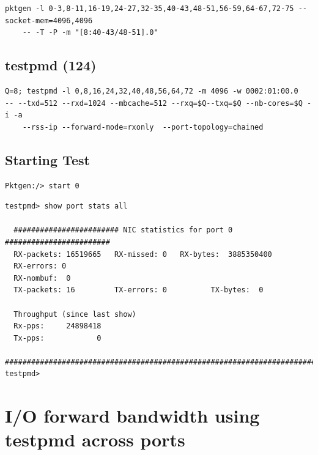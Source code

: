 \documentclass[letter]{article}
\begin{document}
{%
\begin{lstlisting}
pktgen -l 0-3,8-11,16-19,24-27,32-35,40-43,48-51,56-59,64-67,72-75 --socket-mem=4096,4096 
	-- -T -P -m "[8:40-43/48-51].0"
\end{lstlisting}

\subsection{testpmd (124)}

\begin{lstlisting}[escapechar=!]
Q=8; testpmd -l 0,8,16,24,32,40,48,56,64,72 -m 4096 -w 0002:01:00.0 
-- --txd=512 --rxd=1024 --mbcache=512 --rxq=$Q--txq=$Q --nb-cores=$Q -i -a 
	--rss-ip --forward-mode=rxonly  --port-topology=chained
\end{lstlisting}

\subsection{Starting Test}

\begin{lstlisting}[escapechar=!]
Pktgen:/> start 0
\end{lstlisting}

\begin{lstlisting}
testpmd> show port stats all

  ######################## NIC statistics for port 0  ########################
  RX-packets: 16519665   RX-missed: 0   RX-bytes:  3885350400
  RX-errors: 0
  RX-nombuf:  0         
  TX-packets: 16         TX-errors: 0          TX-bytes:  0

  Throughput (since last show)
  Rx-pps:     24898418
  Tx-pps:            0
  ############################################################################
testpmd> 
\end{lstlisting}

\section{I/O forward bandwidth using testpmd across ports}
{\setlength{\parindent}{0cm}

}}
\end{document}
